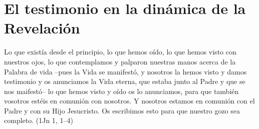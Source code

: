 \section{El testimonio en la dinámica de la Revelación}

Lo que existía desde el principio, lo que hemos oído, lo que hemos visto con
nuestros ojos, lo que contemplamos y palparon nuestras manos acerca de la
Palabra de vida –pues la Vida se manifestó, y nosotros la hemos visto y damos
testimonio y os anunciamos la Vida eterna, que estaba junto al Padre y que se
nos maifestó– lo que hemos visto y oído os lo anunciamos, para que también
vosotros estéis en comunión con nosotros. Y nosotros estamos en comunión con el
Padre y con su Hijo Jesucristo. Os escribimos esto para que nuestro gozo sea
completo. (1Jn 1, 1–4)
